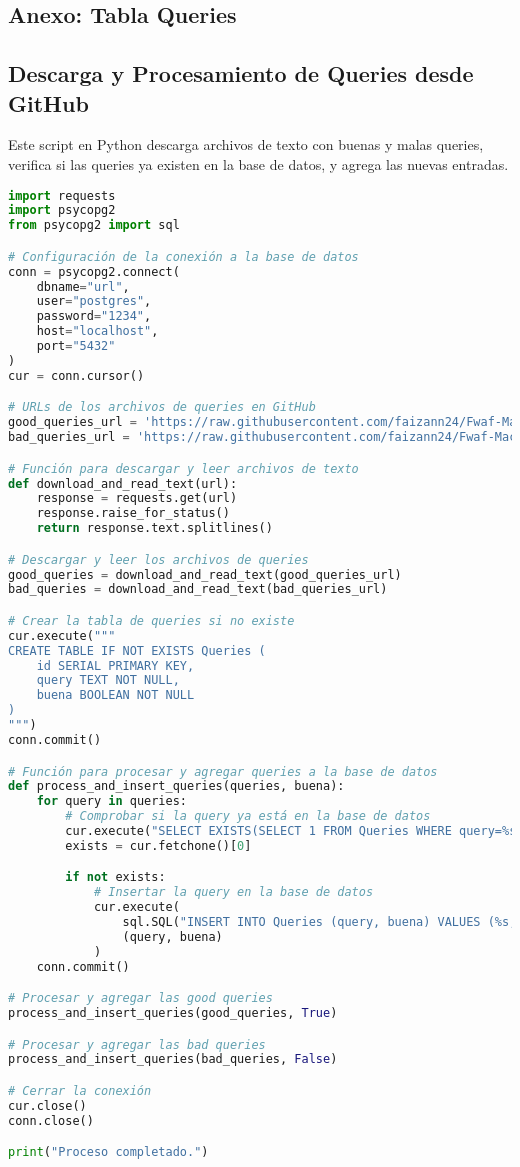 \subsection{Anexo: Tabla Queries}

\subsection*{Descarga y Procesamiento de Queries desde GitHub}

Este script en Python descarga archivos de texto con buenas y malas queries, verifica si las queries ya existen en la base de datos, y agrega las nuevas entradas.

\begin{lstlisting}[language=Python, caption=Script para procesar queries desde archivos de texto]
import requests
import psycopg2
from psycopg2 import sql

# Configuración de la conexión a la base de datos
conn = psycopg2.connect(
    dbname="url",
    user="postgres",
    password="1234",
    host="localhost",
    port="5432"
)
cur = conn.cursor()

# URLs de los archivos de queries en GitHub
good_queries_url = 'https://raw.githubusercontent.com/faizann24/Fwaf-Machine-Learning-driven-Web-Application-Firewall/master/goodqueries.txt'
bad_queries_url = 'https://raw.githubusercontent.com/faizann24/Fwaf-Machine-Learning-driven-Web-Application-Firewall/master/badqueries.txt'

# Función para descargar y leer archivos de texto
def download_and_read_text(url):
    response = requests.get(url)
    response.raise_for_status()
    return response.text.splitlines()

# Descargar y leer los archivos de queries
good_queries = download_and_read_text(good_queries_url)
bad_queries = download_and_read_text(bad_queries_url)

# Crear la tabla de queries si no existe
cur.execute("""
CREATE TABLE IF NOT EXISTS Queries (
    id SERIAL PRIMARY KEY,
    query TEXT NOT NULL,
    buena BOOLEAN NOT NULL
)
""")
conn.commit()

# Función para procesar y agregar queries a la base de datos
def process_and_insert_queries(queries, buena):
    for query in queries:
        # Comprobar si la query ya está en la base de datos
        cur.execute("SELECT EXISTS(SELECT 1 FROM Queries WHERE query=%s)", (query,))
        exists = cur.fetchone()[0]

        if not exists:
            # Insertar la query en la base de datos
            cur.execute(
                sql.SQL("INSERT INTO Queries (query, buena) VALUES (%s, %s)"),
                (query, buena)
            )
    conn.commit()

# Procesar y agregar las good queries
process_and_insert_queries(good_queries, True)

# Procesar y agregar las bad queries
process_and_insert_queries(bad_queries, False)

# Cerrar la conexión
cur.close()
conn.close()

print("Proceso completado.")
\end{lstlisting}

